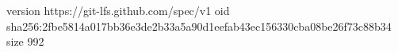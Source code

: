 version https://git-lfs.github.com/spec/v1
oid sha256:2fbe5814a017bb36e3de2b33a5a90d1eefab43ec156330cba08be26f73c88b34
size 992
